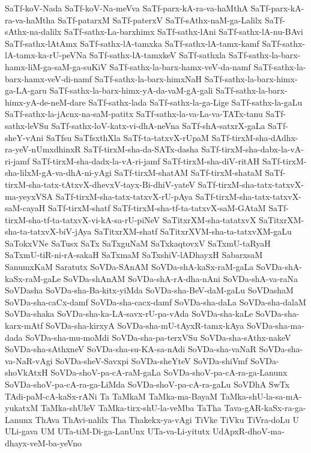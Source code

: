 {SaTf-koV-Nada
SaTf-koV-Na-meVva
SaTf-parx-kA-ra-va-haMthA
SaTf-parx-kA-ra-va-haMtha
SaTf-patarxM
SaTf-paterxV
SaTf-sAthx-naM-ga-Lalilx
SaTf-sAthx-na-dalilx
SaTf-sathx-La-barxhimx
SaTf-sathx-lAni
SaTf-sathx-lA-nu-BAvi
SaTf-sathx-lAtAmx
SaTf-sathx-lA-tamxka
SaTf-sathx-lA-tamx-kamf
SaTf-sathx-lA-tamx-ka-rU-peVNa
SaTf-sathx-lA-tamxkeV
SaTf-sathxla
SaTf-sathx-la-barx-hamx-liM-ga-saM-ga-suKiV
SaTf-sathx-la-barx-hamx-veV-da-namf
SaTf-sathx-la-barx-hamx-veV-di-namf
SaTf-sathx-la-barx-himxNaH
SaTf-sathx-la-barx-himx-ga-LA-garu
SaTf-sathx-la-barx-himx-yA-da-vaM-gA-gali
SaTf-sathx-la-barx-himx-yA-de-neM-dare
SaTf-sathx-lada
SaTf-sathx-la-ga-Lige
SaTf-sathx-la-gaLu
SaTf-sathx-la-jAcnx-na-saM-patitx
SaTf-sathx-la-va-La-va-TATx-tanu
SaTf-sathx-leVSu
SaTf-sathx-loV-katx-vi-dhA-neVna
SaTf-shA-satxrX-gaLa
SaTf-sheY-vAni
SaTfsu
SaTfsxthXla
SaTf-ta-tatxvX-rUpaM
SaTf-tirxM-sha-dAdhx-ra-yeV-nUmxdhinxR
SaTf-tirxM-sha-da-SATx-dasha
SaTf-tirxM-sha-dabx-la-vA-ri-jamf
SaTf-tirxM-sha-dadx-la-vA-ri-jamf
SaTf-tirxM-sha-diV-ritAH
SaTf-tirxM-sha-lilxM-gA-va-dhA-ni-yAgi
SaTf-tirxM-shatAM
SaTf-tirxM-shataM
SaTf-tirxM-sha-tatx-tAtxvX-dhevxV-tayx-Bi-dhiV-yateV
SaTf-tirxM-sha-tatx-tatxvX-ma-yeyxVSA
SaTf-tirxM-sha-tatx-tatxvX-rU-pAya
SaTf-tirxM-sha-tatx-tatxvX-saM-cayaH
SaTf-tirxM-shatf
SaTf-tirxM-sha-tf-ta-tatxvX-saM-GAtaM
SaTf-tirxM-sha-tf-ta-tatxvX-vi-kA-sa-rU-piNeV
SaTitxrXM-sha-tatatxvX
SaTitxrXM-sha-ta-tatxvX-biV-jAya
SaTitxrXM-shatf
SaTitxrXVM-sha-ta-tatxvXM-gaLu
SaTokxVNe
SaTusx
SaTx
SaTxguNaM
SaTxkaqtovxV
SaTxmU-taRyaH
SaTxmU-tiR-ni-rA-sakaH
SaTxmaM
SaTxshiV-lADhayxH
SabarxsaM
SanumxKaM
Saratutx
SoVDa-SAnAM
SoVDa-shA-kaSx-raM-gaLa
SoVDa-shA-kaSx-raM-gaLe
SoVDa-shAnAM
SoVDa-shA-rA-dha-nAni
SoVDa-shA-va-raNa
SoVDasha
SoVDa-sha-Ba-kitx-yiMda
SoVDa-sha-BeV-daM-gaLu
SoVDashaM
SoVDa-sha-caCx-damf
SoVDa-sha-cacx-damf
SoVDa-sha-daLa
SoVDa-sha-dalaM
SoVDa-shaka
SoVDa-sha-ka-LA-savx-rU-pa-vAda
SoVDa-sha-kaLe
SoVDa-sha-karx-mAtf
SoVDa-sha-kirxyA
SoVDa-sha-mU-tAyxR-tamx-kAya
SoVDa-sha-ma-dada
SoVDa-sha-mu-moMdi
SoVDa-sha-pa-terxVSu
SoVDa-sha-sAthx-nakeV
SoVDa-sha-sAthxneV
SoVDa-sha-su-KA-sa-nAdi
SoVDa-sha-vaNaR
SoVDa-sha-va-NaR-vAgi
SoVDa-sheV-Savxpi
SoVDa-sheYteV
SoVDa-shiVmf
SoVDa-shoVkAtxH
SoVDa-shoV-pa-cA-raM-gaLa
SoVDa-shoV-pa-cA-ra-ga-Lanunx
SoVDa-shoV-pa-cA-ra-ga-LiMda
SoVDa-shoV-pa-cA-ra-gaLu
SoVDhA
SwTx
TAdi-paM-cA-kaSx-rANi
Ta
TaMkaM
TaMka-ma-BayaM
TaMka-shU-la-sa-mA-yukatxM
TaMka-shUleV
TaMka-tirx-shU-la-veMba
TaTha
Tava-gAR-kaSx-ra-ga-Lanunx
ThAva
ThAvi-nalilx
Tha
Thakekx-ya-vAgi
TiVke
TiVku
TiVra-doLu
U
ULi-gava
UM
UTa-tiM-Di-ga-LanUnx
UTa-va-Li-yitutx
UdApxR-dhoV-ma-dhayx-veM-ba-yeVno
}

